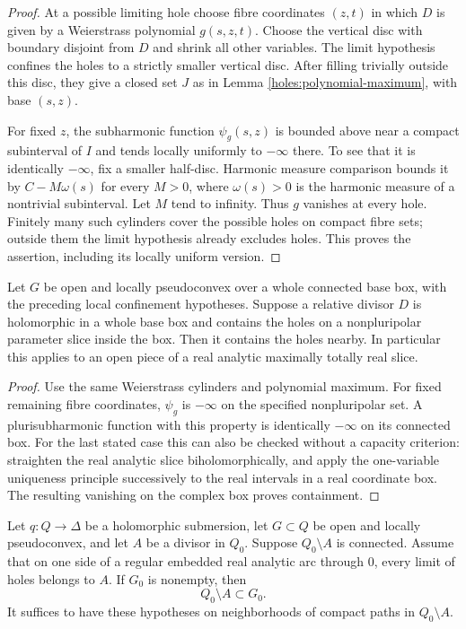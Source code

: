 \begin{proof}
At a possible limiting hole choose fibre coordinates $(z,t)$ in
which $D$ is given by a Weierstrass polynomial $g(s,z,t)$. Choose
the vertical disc with boundary disjoint from $D$ and shrink all
other variables. The limit hypothesis confines the holes to a
strictly smaller vertical disc. After filling trivially outside
this disc, they give a closed set $J$ as in Lemma
\ref{holes:polynomial-maximum}, with base $(s,z)$.

For fixed $z$, the subharmonic function $\psi_g(s,z)$ is bounded
above near a compact subinterval of $I$ and tends locally uniformly
to $-\infty$ there. To see that it is identically $-\infty$, fix a
smaller half-disc. Harmonic measure comparison bounds it by
$C-M\omega(s)$ for every $M>0$, where $\omega(s)>0$ is the
harmonic measure of a nontrivial subinterval. Let $M$ tend to
infinity. Thus $g$ vanishes at every hole. Finitely many such
cylinders cover the possible holes on compact fibre sets; outside
them the limit hypothesis already excludes holes. This proves
the assertion, including its locally uniform version.
\end{proof}

\begin{lemma}\label{holes:interior-trapping}
Let $G$ be open and locally pseudoconvex over a whole connected
base box, with the preceding local confinement hypotheses.
Suppose a relative
divisor $D$ is holomorphic in a whole base box and contains the
holes on a nonpluripolar parameter slice inside the box. Then it
contains the holes nearby. In particular this applies to an open
piece of a real analytic maximally totally real slice.
\end{lemma}

\begin{proof}
Use the same Weierstrass cylinders and polynomial maximum. For
fixed remaining fibre coordinates, $\psi_g$ is $-\infty$ on the
specified nonpluripolar set. A plurisubharmonic function with this
property is identically $-\infty$ on its connected box. For the
last stated case this can also be checked without a capacity
criterion: straighten the real analytic slice biholomorphically,
and apply the one-variable uniqueness principle successively to
the real intervals in a real coordinate box. The resulting
vanishing on the complex box proves containment.
\end{proof}

\begin{lemma}
\label{holes:tangency-propagation}
Let $q:Q\to\Delta$ be a holomorphic submersion, let $G\subset Q$
be open and locally pseudoconvex, and let $A$ be a divisor in
$Q_0$. Suppose $Q_0\setminus A$ is connected. Assume that on one
side of a regular embedded real analytic arc through $0$, every
limit of holes belongs
to $A$. If $G_0$ is nonempty, then
\[
 Q_0\setminus A\subset G_0.
\]
It suffices to have these hypotheses on neighborhoods of compact
paths in $Q_0\setminus A$.
\end{lemma}

